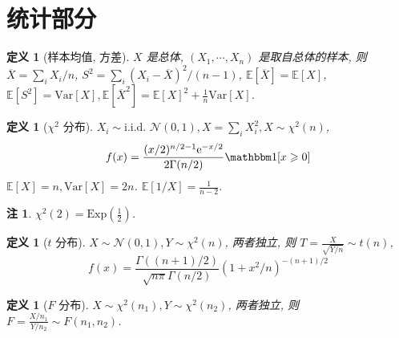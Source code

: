 \documentclass[8pt]{article}
\theoremstyle{compact}
\newtheorem{definition}[theorem]{定义}
\newtheorem{remark}[theorem]{注}
\def\ge{\geqslant}
\def\e{\mathrm{e}}
\def\E#1{\mathbb{E}\left[{#1}\right]}
\def\Var#1{\text{Var}\left[{#1}\right]}
\begin{document}
\section{统计部分}
\begin{definition}[样本均值, 方差]
	$X$ 是总体, $(X_1, \cdots, X_n)$ 是取自总体的样本, 则 $\overline{X} = \sum_i X_i / n$, $S^2 = \sum_i (X_i - \overline{X})^2 / (n - 1)$, $\E{\overline{X}} = \E{X}$, $\E{S^2} = \Var{X}, \E{\overline{X}^2} = \E{X}^2 + \frac1n \Var{X}$.
\end{definition}
\begin{definition}[$\chi^2$ 分布]
	$X_i \sim \text{i.i.d. }\mathcal N(0, 1), X = \sum_i X_i^2, X \sim \chi^2(n)$, $$f(x) = \frac{(x/2)^{n/2-1}\e^{-x/2}}{2\Gamma(n/2)}\mathbbm1[x \ge 0]$$ $\E{X} = n, \Var{X} = 2n$. $\E{1 / X} = \frac{1}{n-2}$.
\end{definition}
\begin{remark}
	$\chi^2(2) = \text{Exp}\left(\frac12\right)$.
\end{remark}
\begin{definition}[$t$ 分布]
	$X \sim \mathcal N(0, 1), Y \sim \chi^2(n)$, 两者独立, 则 $T = \frac{X}{\sqrt{Y / n}} \sim t(n)$, $$f(x) = \frac{\Gamma((n+1)/2)}{\sqrt{n \pi}\Gamma(n/2)}(1 + x^2/n)^{-(n+1)/2}$$
\end{definition}
\begin{definition}[$F$ 分布]
	$X \sim \chi^2(n_1), Y \sim \chi^2(n_2)$, 两者独立, 则 $F = \frac{X / n_1}{Y / n_2} \sim F(n_1, n_2)$.
\end{definition}
\end{document}
